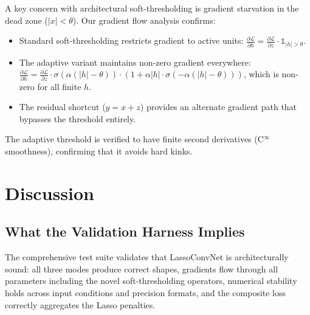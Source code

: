 \documentclass{article}
\begin{document}
A key concern with architectural soft-thresholding is gradient starvation in the
dead zone ($|x| < \theta$). Our gradient flow analysis confirms:
\begin{itemize}
    \item Standard soft-thresholding restricts gradient to active units:
            $\frac{\partial \mathcal{L}}{\partial h} = \frac{\partial
            \mathcal{L}}{\partial z} \cdot \mathbb{1}_{|h| > \theta}$.
    \item The adaptive variant maintains non-zero gradient everywhere:
            $\frac{\partial \mathcal{L}}{\partial h} = \frac{\partial
            \mathcal{L}}{\partial z} \cdot \sigma(\alpha(|h| - \theta))
            \cdot (1 + \alpha |h| \cdot \sigma(-\alpha(|h| - \theta)))$,
          which is non-zero for all finite $h$.
    \item The residual shortcut ($y = x + z$) provides an alternate gradient
          path that bypasses the threshold entirely.
\end{itemize}

The adaptive threshold is verified to have finite second derivatives
(C$^\infty$ smoothness), confirming that it avoids hard kinks.



\section{Discussion}
\label{sec:discussion}

\subsection{What the Validation Harness Implies}

The comprehensive test suite validates that LassoConvNet is architecturally
sound: all three modes produce correct shapes, gradients flow through all
parameters including the novel soft-thresholding operators, numerical
stability holds across input conditions and precision formats, and the
composite loss correctly aggregates the Lasso penalties.
\end{document}
